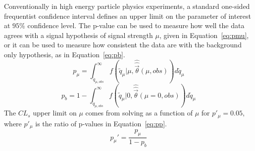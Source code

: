 Conventionally in high energy particle physics experiments, a standard one-sided frequentist confidence interval defines an upper limit on the parameter of interest at $95\%$ confidence level.  The p-value can be used to measure how well the data agrees with a signal hypothesis of signal strength $\mu$, given in Equation~\ref{eq:pmu}, or it can be used to measure how consistent the data are with the background only hypothesis, as in Equation~\ref{eq:pb}.
\begin{equation}
p_\mu=\int_{\tilde{q}_{\mu,obs}}^\infty f(\tilde{q}_\mu|\mu,\hat{\hat{\vec{\theta}}}(\mu,obs)) d\tilde{q}_\mu
\label{eq:pmu}
\end{equation}
\begin{equation}
p_b=1-\int_{\tilde{q}_{\mu,obs}}^\infty f(\tilde{q}_\mu|0,\hat{\hat{\vec{\theta}}}(\mu=0,obs)) d\tilde{q}_\mu
\label{eq:pb}
\end{equation}
The $CL_s$ upper limit on $\mu$ comes from solving as a function of $\mu$ for $p'_\mu=0.05$, where $p'_\mu$ is the ratio of p-values in Equation~\ref{eq:pp}.
\begin{equation}
p_\mu ' = \frac{p_\mu}{1-p_b}
\label{eq:pp}
\end{equation}



